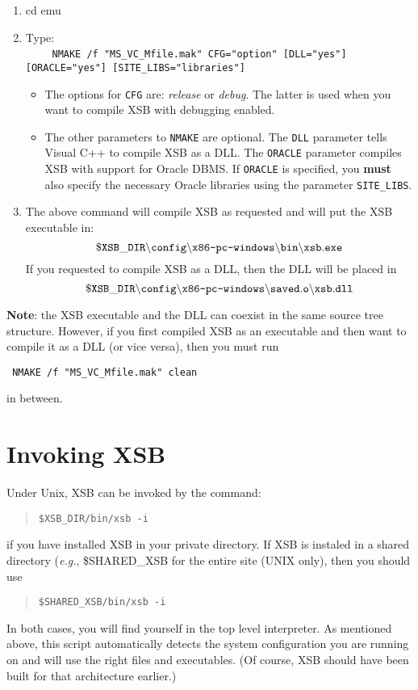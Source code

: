 \begin{enumerate}

\item
   cd emu

\item
  Type:\\
  ~~~~ {\tt NMAKE /f "MS\_VC\_Mfile.mak" CFG="option" [DLL="yes"] [ORACLE="yes"] [SITE\_LIBS="libraries"]}
  \begin{itemize}
    \item  The options for {\tt CFG} are: \emph{release} or \emph{debug}.
      The latter is used when you want to compile XSB with debugging
      enabled.
    \item The other parameters to {\tt NMAKE} are optional. The {\tt DLL}
      parameter tells Visual C++ to compile XSB as a DLL. The {\tt ORACLE}
      parameter compiles XSB with support for Oracle DBMS. If {\tt ORACLE} is
      specified, you {\bf must} also specify the necessary Oracle libraries
      using the parameter {\tt SITE\_LIBS}.
  \end{itemize}
   
 \item The above command will compile XSB as requested and will put the XSB 
   executable in:
\[
 \tt
 \$XSB\_DIR\backslash config\backslash \mbox{\tt x86-pc-windows}\backslash bin
 \backslash xsb.exe
\]
   If you requested to compile XSB as a DLL, then the DLL will be placed in
\[
 \tt
 \$XSB\_DIR\backslash config\backslash \mbox{\tt x86-pc-windows}\backslash
 saved.o \backslash xsb.dll
\]
\end{enumerate}
{\bf Note}: the XSB executable and the DLL can coexist in the same source
tree structure. However, if you first compiled  XSB as an executable and
then want to compile it as a DLL (or vice versa), then you must run 
\begin{verbatim}
 NMAKE /f "MS_VC_Mfile.mak" clean  
\end{verbatim}
in between.


\section{Invoking XSB}

Under Unix, XSB can be invoked by the command:
\begin{quote}
       \tt \$XSB\_DIR/bin/xsb -i
\end{quote}
if you have installed XSB in your private directory.
If XSB is instaled in a shared directory ({\it e.g.}, \$SHARED\_XSB
for the entire site (UNIX only), then you should use
\begin{quote}
       \tt \$SHARED\_XSB/bin/xsb -i
\end{quote}
In both cases, you will find yourself in the top level interpreter.  
As mentioned above, this script automatically detects the system
configuration you are running on and will use the right files and
executables. (Of course, XSB should have been built for that architecture
earlier.)


